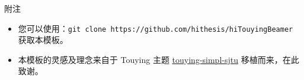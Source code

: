 \documentclass[aspectratio=169]{ctexbeamer} %
\begin{document}
\appendix

\begin{frame}{附注}
  \begin{itemize}
    \item 您可以使用：\texttt{git clone
      https://github.com/hithesis/hiTouyingBeamer}
      获取本模板。
    \item 本模板的灵感及理念来自于 Touying 主题
      \href{https://github.com/sjtug/touying-sjtu}%
      {touying-simpl-sjtu} 移植而来，在此致谢。
  \end{itemize}
\end{frame}


\end{document}
